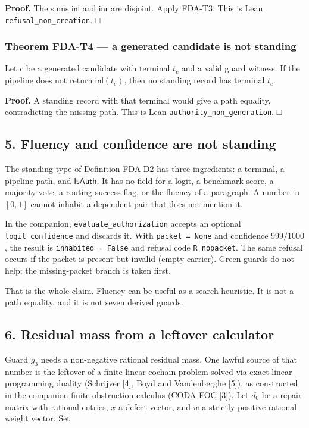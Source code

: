 \documentclass[
  11pt,
]{article}
\begin{document}
\textbf{Proof.} The sums \(\mathsf{inl}\) and \(\mathsf{inr}\) are disjoint. Apply FDA-T3. This is Lean \nolinkurl{refusal_non_creation}. □

\subsubsection{Theorem FDA-T4 --- a generated candidate is not standing}\label{theorem-fda-t4-a-generated-candidate-is-not-standing}

Let \(c\) be a generated candidate with terminal \(t_c\) and a valid guard witness. If the pipeline does not return \(\mathsf{inl}(t_c)\), then no standing record has terminal \(t_c\).

\textbf{Proof.} A standing record with that terminal would give a path equality, contradicting the missing path. This is Lean \nolinkurl{authority_non_generation}. □

\subsection{5. Fluency and confidence are not standing}\label{fluency-and-confidence-are-not-standing}

The standing type of Definition FDA-D2 has three ingredients: a terminal, a pipeline path, and \(\mathsf{IsAuth}\). It has no field for a logit, a benchmark score, a majority vote, a routing success flag, or the fluency of a paragraph. A number in \([0,1]\) cannot inhabit a dependent pair that does not mention it.

In the companion, \nolinkurl{evaluate_authorization} accepts an optional \texttt{logit\_confidence} and discards it. With \texttt{packet\ =\ None} and confidence \(999/1000\), the result is \texttt{inhabited\ =\ False} and refusal code \texttt{R\_nopacket}. The same refusal occurs if the packet is present but invalid (empty carrier). Green guards do not help: the missing-packet branch is taken first.

That is the whole claim. Fluency can be useful as a search heuristic. It is not a path equality, and it is not seven derived guards.

\subsection{6. Residual mass from a leftover calculator}\label{residual-mass-from-a-leftover-calculator}

Guard \(g_3\) needs a non-negative rational residual mass. One lawful source of that number is the leftover of a finite linear cochain problem solved via exact linear programming duality (Schrijver {[}4{]}, Boyd and Vandenberghe {[}5{]}), as constructed in the companion finite obstruction calculus (CODA-FOC {[}3{]}). Let \(d_0\) be a repair matrix with rational entries, \(x\) a defect vector, and \(w\) a strictly positive rational weight vector. Set
\end{document}
